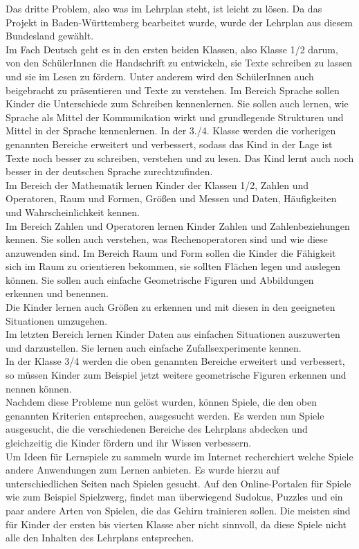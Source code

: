 Das dritte Problem, also was im Lehrplan steht, ist leicht zu lösen. Da das Projekt in Baden-Württemberg bearbeitet wurde, wurde der Lehrplan aus diesem Bundesland gewählt.\\
Im Fach Deutsch geht es in den ersten beiden Klassen, also Klasse 1/2 darum, von den SchülerInnen die Handschrift zu entwickeln, sie Texte schreiben zu lassen und sie im Lesen zu fördern. Unter anderem wird den SchülerInnen auch beigebracht zu präsentieren und Texte zu verstehen. Im Bereich Sprache sollen Kinder die Unterschiede zum Schreiben kennenlernen. Sie sollen auch lernen, wie Sprache als Mittel der Kommunikation wirkt und grundlegende Strukturen und Mittel in der Sprache kennenlernen. In der 3./4. Klasse werden die vorherigen genannten Bereiche erweitert und verbessert, sodass das Kind in der Lage ist Texte noch besser zu schreiben, verstehen und zu lesen. Das Kind lernt auch noch besser in der deutschen Sprache zurechtzufinden\autocite{Deutsch:Lehrplan}.\\
Im Bereich der Mathematik lernen Kinder der Klassen 1/2, Zahlen und Operatoren, Raum und Formen, Größen und Messen und Daten, Häufigkeiten und Wahrscheinlichkeit kennen.\\
Im Bereich Zahlen und Operatoren lernen Kinder Zahlen und Zahlenbeziehungen kennen. Sie sollen auch verstehen, was Rechenoperatoren sind und wie diese anzuwenden sind. Im Bereich Raum und Form sollen die Kinder die Fähigkeit sich im Raum zu orientieren bekommen, sie sollten Flächen legen und auslegen können. Sie sollen auch einfache Geometrische Figuren und Abbildungen erkennen und benennen.\\
Die Kinder lernen auch Größen zu erkennen und mit diesen in den geeigneten Situationen umzugehen.\\
Im letzten Bereich lernen Kinder Daten aus einfachen Situationen auszuwerten und darzustellen. Sie lernen auch einfache Zufallsexperimente kennen.
\\
In der Klasse 3/4 werden die oben genannten Bereiche erweitert und verbessert, so müssen Kinder zum Beispiel jetzt weitere geometrische Figuren erkennen und nennen können\autocite{Mathe:Lehrplan}.
\\
Nachdem diese Probleme nun gelöst wurden, können Spiele, die den oben genannten Kriterien entsprechen, ausgesucht werden. Es werden nun Spiele ausgesucht, die die verschiedenen Bereiche des Lehrplans abdecken und gleichzeitig die Kinder fördern und ihr Wissen verbessern.\\
Um Ideen für Lernspiele zu sammeln wurde im Internet recherchiert welche Spiele andere Anwendungen zum Lernen anbieten. Es wurde hierzu auf unterschiedlichen Seiten nach Spielen gesucht. Auf den Online-Portalen für Spiele wie zum Beispiel Spielzwerg, findet man überwiegend Sudokus, Puzzles und ein paar andere Arten von Spielen, die das Gehirn trainieren sollen. Die meisten sind für Kinder der ersten bis vierten Klasse aber nicht sinnvoll, da diese Spiele nicht alle den Inhalten des Lehrplans entsprechen.\\
